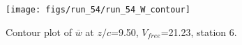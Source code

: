 \begin{figure}[H]
\centering
\texttt{[image: figs/run\_54/run\_54\_W\_contour]}
\caption{Contour plot of $\overline{w}$ at $z/c$=9.50, $V_{free}$=21.23, station 6.}
\end{figure}


